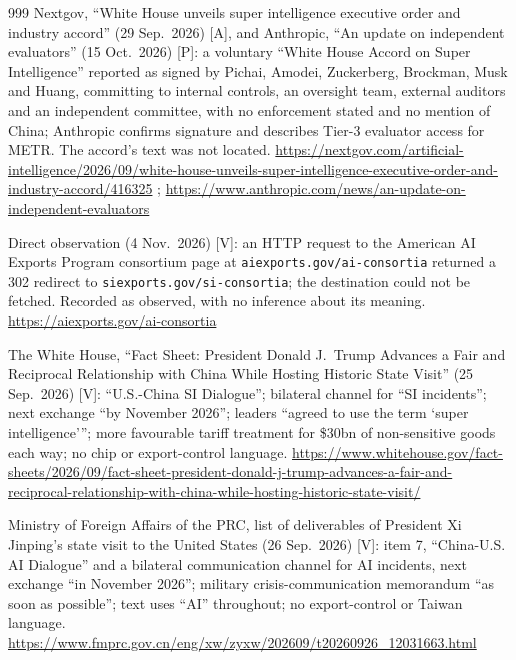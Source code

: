 \begin{thebibliography}{999}
 Nextgov, ``White House unveils super intelligence executive order and industry accord'' (29 Sep.\ 2026) [A], and Anthropic, ``An update on independent evaluators'' (15 Oct.\ 2026) [P]: a voluntary ``White House Accord on Super Intelligence'' reported as signed by Pichai, Amodei, Zuckerberg, Brockman, Musk and Huang, committing to internal controls, an oversight team, external auditors and an independent committee, with no enforcement stated and no mention of China; Anthropic confirms signature and describes Tier-3 evaluator access for METR. The accord's text was not located. \url{https://nextgov.com/artificial-intelligence/2026/09/white-house-unveils-super-intelligence-executive-order-and-industry-accord/416325} ; \url{https://www.anthropic.com/news/an-update-on-independent-evaluators}

 Direct observation (4 Nov.\ 2026) [V]: an HTTP request to the American AI Exports Program consortium page at \texttt{aiexports.gov/ai-consortia} returned a 302 redirect to \texttt{siexports.gov/si-consortia}; the destination could not be fetched. Recorded as observed, with no inference about its meaning. \url{https://aiexports.gov/ai-consortia}

 The White House, ``Fact Sheet: President Donald J.\ Trump Advances a Fair and Reciprocal Relationship with China While Hosting Historic State Visit'' (25 Sep.\ 2026) [V]: ``U.S.-China SI Dialogue''; bilateral channel for ``SI incidents''; next exchange ``by November 2026''; leaders ``agreed to use the term `super intelligence'''; more favourable tariff treatment for \$30bn of non-sensitive goods each way; no chip or export-control language. \url{https://www.whitehouse.gov/fact-sheets/2026/09/fact-sheet-president-donald-j-trump-advances-a-fair-and-reciprocal-relationship-with-china-while-hosting-historic-state-visit/}

 Ministry of Foreign Affairs of the PRC, list of deliverables of President Xi Jinping's state visit to the United States (26 Sep.\ 2026) [V]: item 7, ``China-U.S. AI Dialogue'' and a bilateral communication channel for AI incidents, next exchange ``in November 2026''; military crisis-communication memorandum ``as soon as possible''; text uses ``AI'' throughout; no export-control or Taiwan language. \url{https://www.fmprc.gov.cn/eng/xw/zyxw/202609/t20260926_12031663.html}


\end{thebibliography}
